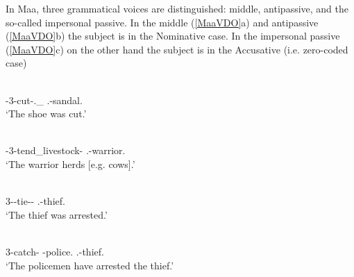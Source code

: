 In Maa, three grammatical voices are distinguished: middle, antipassive, and the so-called impersonal passive.
In the middle (\ref{MaaVDO}a) and antipassive (\ref{MaaVDO}b) the subject is in the Nominative  case. 
In the impersonal passive (\ref{MaaVDO}c) on the other hand the subject is in the Accusative (i.e. zero-coded case)

\enlargethispage{\baselineskip}
\begin{exe}\ex\label{MaaVDO} 
\begin{xlist}
\ex\gll{} \\
\con{}-3-cut-\Mid{}.\Non{}\_\pfv{} \fem{}.\sg{}-sandal.\nom{}\\ %
\glt `The shoe was cut.'

\ex\gll{} \\
\con{}-3-tend\_livestock-\antip{} \mas{}.\sg{}-warrior.\nom{}\\
\glt `The warrior herds [e.g. cows].'

\ex\gll{} \\
3-\prf{}-tie-\prf{}-\pass{} \mas{}.\sg{}-thief.\acc{}\\
\glt `The thief was arrested.'

\ex\gll{} 	\\
3-catch-\prf{} \pl{}-police.\nom{} \mas{}.\sg{}-thief.\acc{}\\
\glt `The policemen have arrested the thief.'
\end{xlist}
\end{exe}


